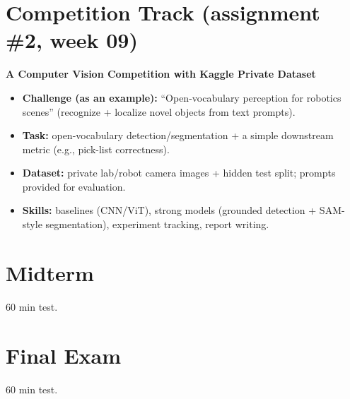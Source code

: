 \documentclass[a4paper,11pt]{texMemo}
\begin{document}
\section{Competition Track (assignment \#2, week 09)}
\textbf{A Computer Vision Competition with Kaggle Private Dataset}
\begin{itemize}
    \item \textbf{Challenge (as an example):} ``Open-vocabulary perception for robotics scenes'' (recognize + localize novel objects from text prompts).
    \item \textbf{Task:} open-vocabulary detection/segmentation + a simple downstream metric (e.g., pick-list correctness).
    \item \textbf{Dataset:} private lab/robot camera images + hidden test split; prompts provided for evaluation.
    \item \textbf{Skills:} baselines (CNN/ViT), strong models (grounded detection + SAM-style segmentation), experiment tracking, report writing.
\end{itemize}

\section{Midterm}
60 min test. 
\section{Final Exam}
60 min test.


\end{document}
